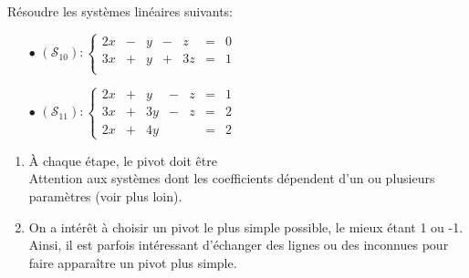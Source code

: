\documentclass[a4paper, 11pt]{article}
\begin{document}
\begin{exemples}
R\'esoudre les syst\`{e}mes lin\'eaires suivants:\\

\begin{itemize}
\item[$\bullet$] $(\mathcal{S}_{10}):\left\lbrace\begin{array}{rcrcrcr}
2x&-&y&-&z&=&0\\
3x&+&y&+&3z&=&1\\
\end{array}\right.$
\end{itemize}


\begin{itemize}
\item[$\bullet$] $(\mathcal{S}_{11}):
\left\lbrace\begin{array}{rcrcrcr}
2x &+ &y &- & z & = &1\\
3x &+ &3y &- & z & = &2\\
2x &+ &4y& &&= &2
\end{array}\right.$
\end{itemize}

\end{exemples}

\begin{rems}
\begin{enumerate}
 \item 
\noindent \warning \`{A} chaque \'etape, le pivot doit \^etre \dotfill \phantom{\hspace{5cm}}\\
\noindent Attention aux syst\`emes dont les coefficients d\'ependent d'un ou plusieurs param\`etres (voir plus loin).
\item 
On a int\'er\^et \`a choisir un pivot le plus simple possible, le mieux \'etant 1 ou -1. Ainsi, il est parfois int\'eressant d'\'echanger des lignes ou des inconnues pour faire appara\^itre un pivot plus simple.
\end{enumerate}
\end{rems}
\end{document}
